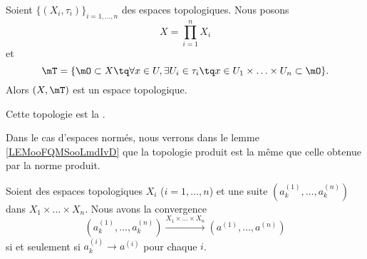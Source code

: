 \begin{propositionDef}      \label{DefIINHooAAjTdY}
	Soient \( \{ (X_i,\tau_i) \}_{i=1,\ldots, n}\) des espaces topologiques. Nous posons
	\begin{equation}
		X=\prod_{i=1}^nX_i
	\end{equation}
	et
	\begin{equation}		\label{EQooVECGooKLUkTy}
		\mT=\{ \mO\subset X\tq \forall x\in U,\exists U_i\in\tau_i\tq x\in U_1\times\ldots\times U_n\subset \mO \}.
	\end{equation}
	Alors \( (X,\mT)\) est un espace topologique.

	Cette topologie est la .
\end{propositionDef}


Dans le cas d'espaces normés, nous verrons dans le lemme \ref{LEMooFQMSooLmdIvD} que la topologie produit est la même que celle obtenue par la norme produit.

\begin{proposition}
	Soient des espaces topologiques \( X_i\) (\( i=1,\ldots, n\)) et une suite \( (a^{(1)}_k,\ldots, a^{(n)}_k)\) dans \( X_1\times\ldots \times X_n\). Nous avons la convergence
	\begin{equation}
		(a^{(1)}_k,\ldots, a^{(n)}_k)\stackrel{X_1\times\ldots \times X_n}{\longrightarrow}(a^{(1)},\ldots, a^{(n)})
	\end{equation}
	si et seulement si \( a^{(i)}_k\to a^{(i)}\) pour chaque \( i\).
\end{proposition}

